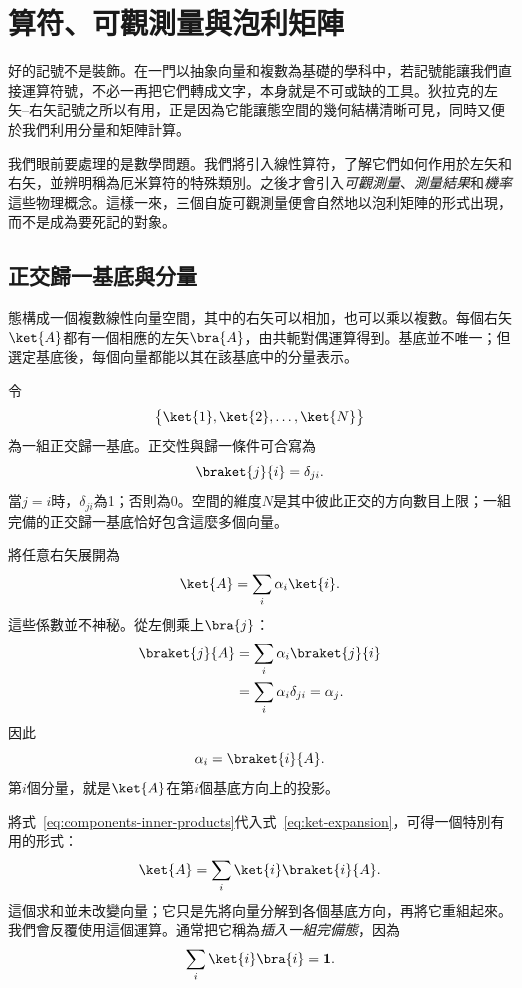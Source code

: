 \chapter{算符、可觀測量與泡利矩陣}

好的記號不是裝飾。在一門以抽象向量和複數為基礎的學科中，若記號能讓我們直接運算符號，不必一再把它們轉成文字，本身就是不可或缺的工具。狄拉克的左矢--右矢記號之所以有用，正是因為它能讓態空間的幾何結構清晰可見，同時又便於我們利用分量和矩陣計算。

我們眼前要處理的是數學問題。我們將引入線性算符，了解它們如何作用於左矢和右矢，並辨明稱為厄米算符的特殊類別。之後才會引入\emph{可觀測量}、\emph{測量結果}和\emph{機率}這些物理概念。這樣一來，三個自旋可觀測量便會自然地以泡利矩陣的形式出現，而不是成為要死記的對象。

\section{正交歸一基底與分量}

態構成一個複數線性向量空間，其中的右矢可以相加，也可以乘以複數。每個右矢\(\ket{A}\)都有一個相應的左矢\(\bra{A}\)，由共軛對偶運算得到。基底並不唯一；但選定基底後，每個向量都能以其在該基底中的分量表示。

令
\[
\bigl\{\ket{1},\ket{2},\ldots,\ket{N}\bigr\}
\]
為一組正交歸一基底。正交性與歸一條件可合寫為
\begin{equation}
\braket{j}{i}=\delta_{ji}.
\label{eq:orthonormal-basis}
\end{equation}
當\(j=i\)時，\(\delta_{ji}\)為1；否則為0。空間的維度\(N\)是其中彼此正交的方向數目上限；一組完備的正交歸一基底恰好包含這麼多個向量。

將任意右矢展開為
\begin{equation}
\ket{A}=\sum_i \alpha_i\ket{i}.
\label{eq:ket-expansion}
\end{equation}
這些係數並不神秘。從左側乘上\(\bra{j}\)：
\begin{align}
\braket{j}{A}
 &=\sum_i\alpha_i\braket{j}{i} \\
 &=\sum_i\alpha_i\delta_{ji}
 =\alpha_j.
\end{align}
因此
\begin{equation}
\alpha_i=\braket{i}{A}.
\label{eq:components-inner-products}
\end{equation}
第\(i\)個分量，就是\(\ket{A}\)在第\(i\)個基底方向上的投影。

將式~\eqref{eq:components-inner-products}代入式~\eqref{eq:ket-expansion}，可得一個特別有用的形式：
\begin{equation}
\ket{A}=\sum_i\ket{i}\braket{i}{A}.
\label{eq:ket-completeness-action}
\end{equation}
這個求和並未改變向量；它只是先將向量分解到各個基底方向，再將它重組起來。我們會反覆使用這個運算。通常把它稱為\emph{插入一組完備態}，因為
\begin{equation}
\sum_i\ket{i}\bra{i}=\mathbf 1.
\label{eq:resolution-identity}
\end{equation}

